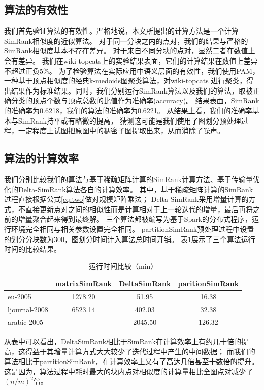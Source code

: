 \documentclass[master]{njuthesis}
\begin{document}
\subsection{算法的有效性}
我们首先验证算法的有效性。严格地说，本文所提出的计算方法是一个计算SimRank相似度的近似算法。
对于同一分块之内的点对，我们的结果与严格的SimRank相似度基本不存在差异。
对于来自不同分块的点对，显然二者在数值上会有差异。
我们在wiki-topcats上的实验结果表面，它们的计算结果在数值上差异不超过正负$5\%$。
为了检验算法在实际应用中语义层面的有效性，我们使用PAM\cite{kaufman:clustering1990}，一种基于顶点相似度的经典k-medoids图聚类算法，对wiki-topcats
进行聚类，得出结果作为标准结果。同时，我们分别运行SimRank算法以及我们的算法，取被正确分类的顶点个数与顶点总数的比值作为准确率(accuracy)。
结果表面，SimRank的准确率为0.6218，我们的算法的准确率为0.6221。
从结果上看，我们的准确率基本与SimRank持平或有略微的提高，
猜测这可能是我们使用了图划分预处理过程，一定程度上试图把原图中的稠密子图提取出来，从而消除了噪声。

\subsection{算法的计算效率}
我们分别比较我们的算法与基于稀疏矩阵计算的SimRank计算方法、基于传输量优化的Delta-SimRank算法各自的计算效率。
其中，基于稀疏矩阵计算的SimRank过程直接根据公式\ref{eq:two}做对规模矩阵乘法；
Delta-SimRank\cite{cao2012delta}采用增量计算的方式，不直接更新点对之间的相似性而是计算相对于上一轮迭代的增量，最后再将之前的增量聚合起来得到最终解。
三个算法都被编写为基于Spark的分布式程序，运行环境完全相同与相关参数设置完全相同。
partitionSimRank预处理过程中设置的划分分块数为300，图划分时间计入算法总时间开销。
表\ref{tab:cha3_time}展示了三个算法运行时间的比较结果。
\begin{table}[ht]
\caption{运行时间比较（min）}
\label{tab:cha3_time}
\centering
\begin{tabular}{|l|c|c|c|}
\hline
& \textbf{matrixSimRank} & \textbf{DeltaSimRank} & \textbf{paritionSimRank} \\
\hline
eu-2005 & \num{1278.20} & \num{51.95}          & \num{16.38}       \\
\hline
ljournal-2008     & \num{6523.14}  & \num{402.03 }          & \num{32.38}    \\
\hline
arabic-2005  & - & \num{2045.50}         & \num{126.32}    \\
\hline
\end{tabular}
\end{table}
从表中可以看出，DeltaSimRank相比于SimRank在计算效率上有约几十倍的提高，这得益于其增量计算方式大大较少了迭代过程中产生的中间数据；
而我们的算法相比于partitionSimRank，在计算效率上又有了高达几倍甚至十数倍的提升。
这是因为，算法过程中耗时最大的块内点对相似度的计算量相比全图点对减少了$(n/m)^2$倍。
\end{document}
